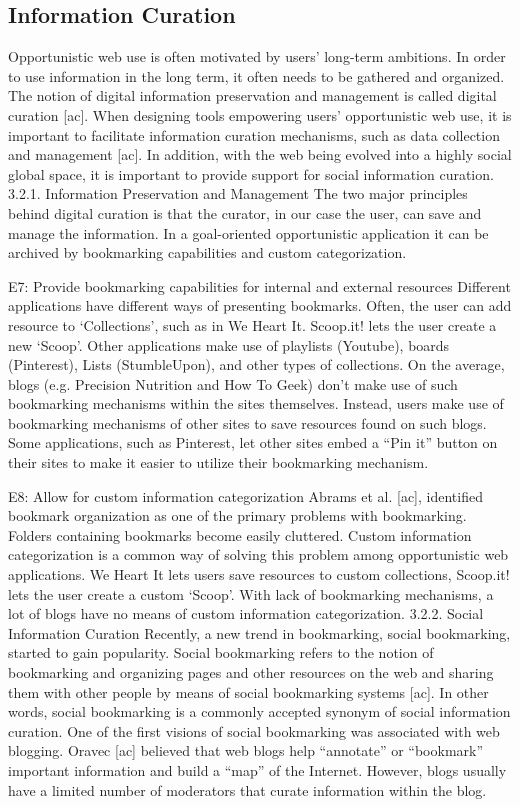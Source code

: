 \documentclass{casconpaper}
\begin{document}
{\subsection{Information Curation}
Opportunistic web use is often motivated by users’ long-term ambitions. In order to use information in the long term, it often needs to be gathered and organized. The notion of digital information preservation and management is called digital curation [ac]. When designing tools empowering users’ opportunistic web use, it is important to facilitate information curation mechanisms, such as data collection and management [ac]. In addition, with the web being evolved into a highly social global space, it is important to provide support for social information curation.
3.2.1. Information Preservation and Management
The two major principles behind digital curation is that the curator, in our case the user, can save and manage the information. In a goal-oriented opportunistic application it can be archived by bookmarking capabilities and custom categorization.

E7: Provide bookmarking capabilities for internal and external resources
Different applications have different ways of presenting bookmarks. Often, the user can add resource to ‘Collections’, such as in We Heart It. Scoop.it! lets the user create a new ‘Scoop’. Other applications make use of playlists (Youtube), boards (Pinterest), Lists (StumbleUpon), and other types of collections. On the average, blogs (e.g. Precision Nutrition and How To Geek) don’t make use of such bookmarking mechanisms within the sites themselves. Instead, users make use of bookmarking mechanisms of other sites to save resources found on such blogs. Some applications, such as Pinterest, let other sites embed a “Pin it” button on their sites to make it easier to utilize their bookmarking mechanism.

E8: Allow for custom information categorization
Abrams et al. [ac], identified bookmark organization as one of the primary problems with bookmarking. Folders containing bookmarks become easily cluttered. Custom information categorization is a common way of solving this problem among opportunistic web applications. We Heart It lets users save resources to custom collections, Scoop.it! lets the user create a custom ‘Scoop’. With lack of bookmarking mechanisms, a lot of blogs have no means of custom information categorization. 
3.2.2. Social Information Curation
Recently, a new trend in bookmarking, social bookmarking, started to gain popularity. Social bookmarking refers to the notion of bookmarking and organizing pages and other resources on the web and sharing them with other people by means of social bookmarking systems [ac]. In other words, social bookmarking is a commonly accepted synonym of social information curation. One of the first visions of social bookmarking was associated with web blogging. Oravec [ac] believed that web blogs help “annotate” or “bookmark” important information and build a “map” of the Internet. However, blogs usually have a limited number of moderators that curate information within the blog. 

}
\end{document}
